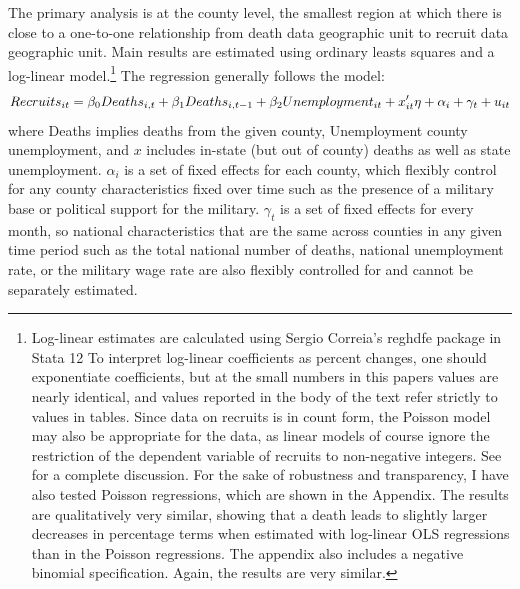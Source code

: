 \documentclass[12pt] {article}
\begin{document}
The primary analysis is at the county level, the smallest region at which there is close to a one-to-one relationship from death data geographic unit to recruit data geographic unit. Main results are estimated using ordinary leasts squares and a log-linear model.\footnote{Log-linear estimates are calculated using Sergio Correia's reghdfe package in Stata 12 \citep{reghdfe} To interpret log-linear coefficients as percent changes, one should exponentiate coefficients, but at the small numbers in this papers values are nearly identical, and values reported in the body of the text refer strictly to values in tables. Since data on recruits is in count form, the Poisson model may also be appropriate for the data, as linear models of course ignore the restriction of the dependent variable of recruits to non-negative integers. See \cite{cameron2013countdata} for a complete discussion. For the sake of robustness and transparency, I have also tested Poisson regressions, which are shown in the Appendix. The results are qualitatively very similar, showing that a death leads to slightly larger decreases in percentage terms when estimated with log-linear OLS regressions than in the Poisson regressions. The appendix also includes a negative binomial specification. Again, the results are very similar.} The regression generally follows the model:
$$Recruits_{it}=\beta_{0}Deaths_{i,t}+\beta_{1}Deaths_{i,t-1}+\beta_{2}Unemployment_{it}\\
+x'_{it}\eta+\alpha_{i}+\gamma_{t}+u_{it}$$
where Deaths implies deaths from the given county, Unemployment county unemployment, and $x$ includes in-state (but out of county) deaths as well as
state unemployment. $\alpha_{i}$ is a set of fixed effects for each county, which flexibly control for any county characteristics fixed over time such as the presence of a military base or political support for the military. $\gamma_{t}$ is a set of fixed effects for every month, so national characteristics that are the same across counties in any given time period such as the total national number of deaths, national
unemployment rate, or the military wage rate are also flexibly controlled for and cannot be separately estimated. 

\begin{table}
\caption{}
\label{Flo:loglinear}
\scalebox{0.9}{

}
\end{table}
\end{document}
